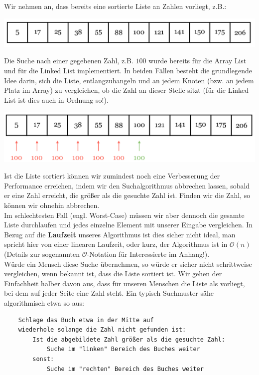 \documentclass{article}
\begin{document}
Wir nehmen an, dass bereits eine sortierte Liste an Zahlen vorliegt, z.B.:
\begin{center}
    \includegraphics[scale=0.25]{../media/search.png}
\end{center}
Die Suche nach einer gegebenen Zahl, z.B. $100$ wurde bereits für die Array List und für die Linked List implementiert. In beiden Fällen besteht die grundlegende Idee darin, sich die Liste, entlangzuhangeln und an jedem Knoten (bzw. an jedem Platz im Array) zu vergleichen, ob die Zahl an dieser Stelle sitzt (für die Linked List ist dies auch in Ordnung so!).
\begin{center}
    \includegraphics[scale=0.25]{../media/search2.png}
\end{center}
Ist die Liste sortiert können wir zumindest noch eine Verbesserung der Performance erreichen, indem wir den Suchalgorithmus abbrechen lassen, sobald er eine Zahl erreicht, die größer als die gesuchte Zahl ist. Finden wir die Zahl, so können wir ohnehin abbrechen.\\
Im schlechtesten Fall (engl. Worst-Case) müssen wir aber dennoch die gesamte Liste durchlaufen und jedes einzelne Element mit unserer Eingabe vergleichen. In Bezug auf die \textbf{Laufzeit} unseres Algorithmus ist dies sicher nicht ideal, man spricht hier von einer linearen Laufzeit, oder kurz, der Algorithmus ist in $\mathcal{O}(n)$ (Details zur sogenannten $\mathcal{O}$-Notation für Interessierte im Anhang!). \\
Würde ein Mensch diese Suche übernehmen, so würde er sicher nicht schrittweise vergleichen, wenn bekannt ist, dass die Liste sortiert ist. Wir gehen der Einfachheit halber davon aus, dass für unseren Menschen die Liste als  vorliegt, bei dem auf jeder Seite eine Zahl steht. Ein typisch  Suchmuster sähe algorithmisch etwa so aus:
\begin{verbatim}
    Schlage das Buch etwa in der Mitte auf 
    wiederhole solange die Zahl nicht gefunden ist:
        Ist die abgebildete Zahl größer als die gesuchte Zahl:
            Suche im "linken" Bereich des Buches weiter
        sonst:
            Suche im "rechten" Bereich des Buches weiter 
\end{verbatim}
\end{document}
